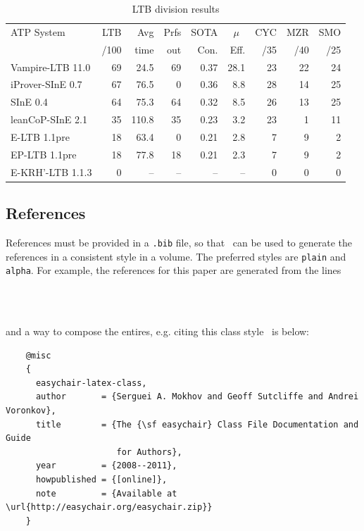 \documentclass[EPiC]{easychair}
\begin{document}
\begin{table}[htp]
	\begin{centering}
		\begin{tabular}{lrrrrrrrr}
		\hline
		ATP System            & LTB & Avg  &Prfs & SOTA & \multicolumn{1}{c}{$\mu$} & CYC & MZR & SMO \\
		                      & /100& time & out & Con. & Eff. & /35 & /40 & /25 \\
		\hline
		Vampire-LTB 11.0      &  69 & 24.5 &  69 & 0.37 & 28.1 &  23 &  22 &  24 \\
		iProver-SInE 0.7      &  67 & 76.5 &   0 & 0.36 &  8.8 &  28 &  14 &  25 \\
		SInE 0.4              &  64 & 75.3 &  64 & 0.32 &  8.5 &  26 &  13 &  25 \\
		leanCoP-SInE 2.1      &  35 &110.8 &  35 & 0.23 &  3.2 &  23 &   1 &  11 \\
		E-LTB 1.1pre          &  18 & 63.4 &   0 & 0.21 &  2.8 &   7 &   9 &   2 \\
		EP-LTB 1.1pre         &  18 & 77.8 &  18 & 0.21 &  2.3 &   7 &   9 &   2 \\
		E-KRH'-LTB 1.1.3      &   0 &   -- &  -- &   -- &   -- &   0 &   0 &   0 \\
		\hline
		\end{tabular}
		\caption{LTB division results}
		\label{tab:ltbexample}
	\end{centering}
\end{table}

\subsection{References}
\label{sect:references}

References must be provided in a {\tt .bib} file, so that \BibTeX\ can
be used to generate the references in a consistent style in a volume.
The preferred styles are {\tt plain} and {\tt alpha}.
For example, the references for this paper are generated from the
lines
\begin{verbatim}
    
    
\end{verbatim}
and a way to compose the entires, e.g. citing this class style~\cite{easychair-latex-class}
is below:
\small
\begin{verbatim}
    @misc
    {
      easychair-latex-class,
      author       = {Serguei A. Mokhov and Geoff Sutcliffe and Andrei Voronkov},
      title        = {The {\sf easychair} Class File Documentation and Guide
                      for Authors},
      year         = {2008--2011},
      howpublished = {[online]},
      note         = {Available at \url{http://easychair.org/easychair.zip}}
    }
\end{verbatim}
\normalsize
\end{document}
